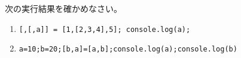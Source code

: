 \begin{Prob}\upshape
 次の実行結果を確かめなさい。
 \begin{enumerate}
  \item \texttt{[,[,a]] = [1,[2,3,4],5]; console.log(a);}
  \item \texttt{a=10;b=20;[b,a]=[a,b];console.log(a);console.log(b)}
 \end{enumerate}
\end{Prob}
